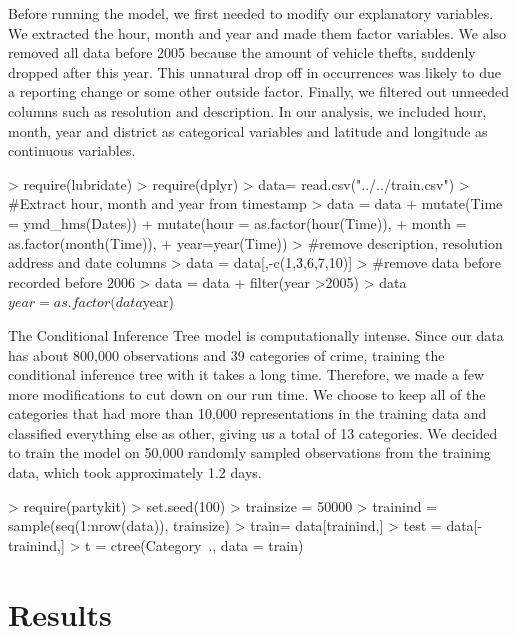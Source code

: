 \documentclass[11pt]{article}
\begin{document}
Before running the model, we first needed to modify  our explanatory variables. We extracted the hour, month and year and made them factor variables. We also removed all data before 2005 because the amount of vehicle thefts, suddenly dropped after this year. This unnatural drop off in occurrences was likely to due a reporting change or some other outside factor.  Finally, we filtered out unneeded columns such as resolution and description. In our analysis, we included hour, month, year and district as categorical variables and latitude and longitude as continuous variables. 

\begin{Schunk}
\begin{Sinput}
> require(lubridate)
> require(dplyr)
> data= read.csv("../../train.csv")
> #Extract  hour, month and year from timestamp
> data = data %>% 
+   mutate(Time = ymd_hms(Dates)) %>%
+   mutate(hour = as.factor(hour(Time)), 
+          month = as.factor(month(Time)), 
+          year=year(Time))
> #remove description, resolution address and date columns
> data = data[,-c(1,3,6,7,10)]
> #remove data before recorded before 2006
> data = data %>%
+   filter(year >2005)
> data$year = as.factor(data$year)
\end{Sinput}
\end{Schunk}

The Conditional Inference Tree model is computationally intense. Since our data has about 800,000 observations and 39 categories of crime, training the conditional inference tree with it takes a long time. Therefore, we made a few more modifications to cut down on our run time. We choose to keep all of the categories that had more than 10,000 representations in the training data and classified everything else as other, giving us a total of 13 categories. We decided to train the model on 50,000 randomly sampled observations from the training data, which took approximately 1.2 days. 

\begin{Schunk}
\begin{Sinput}
> require(partykit)
> set.seed(100)
> trainsize = 50000
> trainind = sample(seq(1:nrow(data)), trainsize)
> train= data[trainind,]
> test = data[-trainind,]
> t = ctree(Category~., data = train)
\end{Sinput}
\end{Schunk}
  
\section*{Results}
\end{document}
